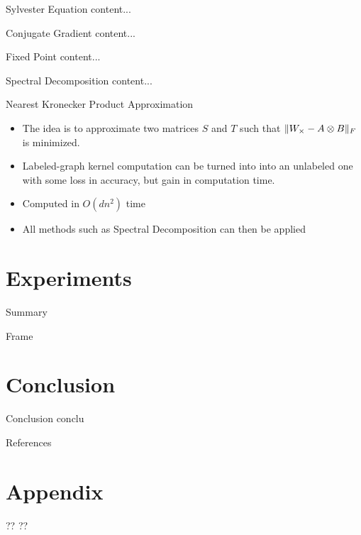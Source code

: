 \documentclass[compress]{beamer}
\DeclarePairedDelimiter{\norm}{\lVert}{\rVert}
\begin{document}
\begin{frame}{Sylvester Equation}
	content...
\end{frame}
\begin{frame}{Conjugate Gradient}
	content...
\end{frame}
\begin{frame}{Fixed Point}
content...
\end{frame}
\begin{frame}{Spectral Decomposition}
content...
\end{frame}
\begin{frame}{Nearest Kronecker Product Approximation}
\begin{itemize}
	\item The idea is to approximate two matrices $S$ and $T$ such that $\norm{W_\times - A\otimes B}_F$ is minimized.
	\item Labeled-graph kernel computation can be turned into into an unlabeled one with some loss in accuracy, but gain in computation time.
	\item Computed in $O(dn^2)$ time 
	\item All methods such as Spectral Decomposition can then be applied
\end{itemize}
\end{frame}


\section{Experiments}
\begin{frame}{Summary}
  \tableofcontents[currentsection]
\end{frame}
\begin{frame}{Frame}
    
\end{frame}

\section{Conclusion}
\begin{frame}[plain]{Conclusion}
conclu
\end{frame}

\renewcommand\bibsection{\subsection{\refname}}
\begin{frame}[plain]{References}
\nocite{bondy1976graph,borgwardt_protein_2005,imrich2000product,burges_tutorial_1998,vapnik_statistical_1998,nesterov_lectures_2018,shervashidze_efficient_2009}

\footnotesize

\end{frame}

\appendix
\section[]{Appendix}
\begin{frame}[plain]{??}
??
\end{frame}
\end{document}
